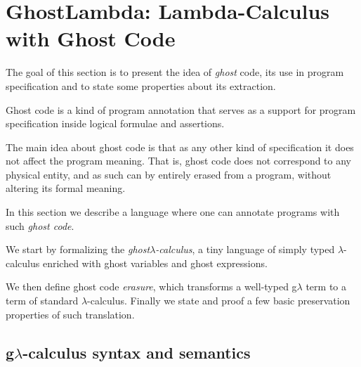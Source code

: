 \section{GhostLambda: Lambda-Calculus with Ghost Code}
%
% 
%   
The goal of this section is to present the idea of \textit{ghost} code,
its use in program specification and to state some properties about its 
extraction.

Ghost code is a kind of program annotation that serves 
as a support for program specification inside logical formulae and assertions.

The main idea about ghost code is that as any other kind of
 specification it does not affect the program meaning. That is, ghost
 code does not correspond to any physical entity, and as such can by entirely erased from a program, without altering its formal meaning. 
 
In this section we describe a language where one can annotate programs 
with such \textit{ghost code}.

We start by formalizing the \textit{ghost}$\lambda$\textit{-calculus}, 
a tiny language of simply typed $\lambda$-calculus enriched with ghost variables and ghost expressions.

We then define ghost code \textit{erasure}, which transforms a well-typed g$\lambda $ term  to a term of standard  $\lambda$-calculus.
Finally we state and proof a few basic preservation properties of such translation.

\subsection{g$\lambda$-calculus syntax and semantics}

